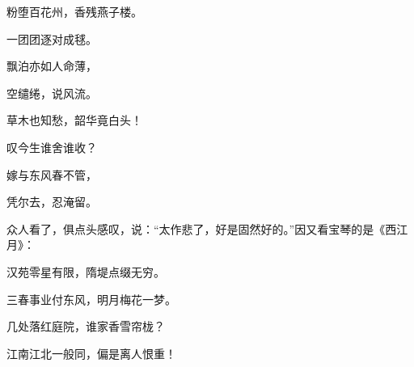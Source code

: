\begin{poem}
    \begin{pl}

        粉堕百花州，香残燕子楼。
    \end{pl}
    \begin{pl}

        一团团逐对成毬。
    \end{pl}
    \begin{pl}

        飘泊亦如人命薄，
    \end{pl}
    \begin{pl}

        空缱绻，说风流。
    \end{pl}
    \begin{pl}

        草木也知愁，韶华竟白头！
    \end{pl}
    \begin{pl}

        叹今生谁舍谁收？
    \end{pl}
    \begin{pl}

        嫁与东风春不管，
    \end{pl}
    \begin{pl}

        凭尔去，忍淹留。
    \end{pl}
\end{poem}


\begin{parag}
    众人看了，俱点头感叹，说：“太作悲了，好是固然好的。”因又看宝琴的是《西江月》：
\end{parag}


\begin{poem}
    \begin{pl}

        汉苑零星有限，隋堤点缀无穷。
    \end{pl}
    \begin{pl}

        三春事业付东风，明月梅花一梦。
    \end{pl}
    \begin{pl}

        几处落红庭院，谁家香雪帘栊？
    \end{pl}
    \begin{pl}

        江南江北一般同，偏是离人恨重！
    \end{pl}
\end{poem}


